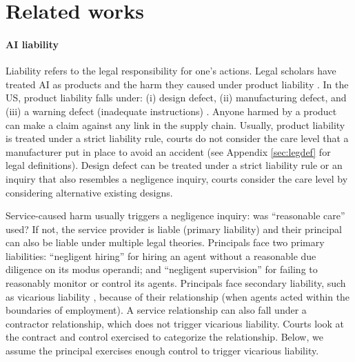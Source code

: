 \documentclass[11pt]{article}
\begin{document}



\section{Related works}

\paragraph{AI liability} Liability refers to the legal responsibility for one's actions. Legal scholars have treated AI as products and the harm they caused under product liability \citep{abraham2019automated,buiten_product_2024,sharkey_products_2024}.  In the US, product liability falls under: (i) design defect, (ii) manufacturing defect, and (iii) a warning defect (inadequate instructions) \citep{abraham2012forms}. Anyone harmed by a product can make a claim against any link in the supply chain.  Usually, product liability is treated under a strict liability rule, courts do not consider the care level that a manufacturer put in place to avoid an accident (see Appendix \ref{sec:legdef} for legal definitions).  Design defect can be treated under a strict liability rule or an inquiry that also resembles a negligence inquiry, courts consider the care level by considering alternative existing designs.

Service-caused harm usually triggers a negligence inquiry: was ``reasonable care'' used?  If not, the service provider is liable (primary liability) and their principal can also be liable under multiple legal theories.  Principals face two primary liabilities: ``negligent hiring'' for hiring an agent without a reasonable due diligence on its modus operandi; and ``negligent supervision'' for failing to reasonably monitor or control its agents.  Principals face secondary liability, such as vicarious liability \citep{sykes_economics_1984,diamantis_vicarious_2023}, because of their relationship (when agents acted within the boundaries of employment).  A service relationship can also fall under a contractor relationship, which does not trigger vicarious liability. Courts look at the contract and control exercised to categorize the relationship. Below, we assume the principal exercises enough control to trigger vicarious liability.
\end{document}
